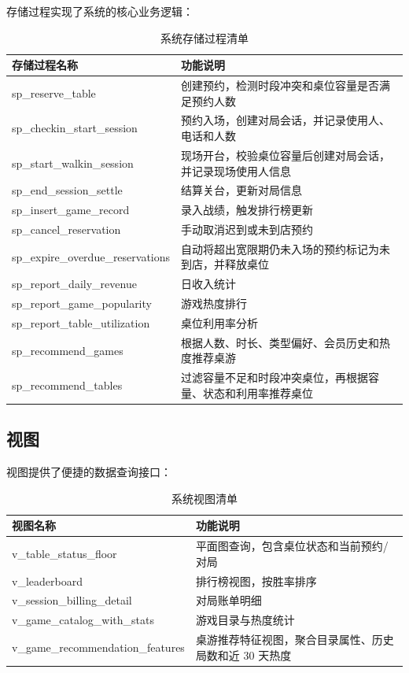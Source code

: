 存储过程实现了系统的核心业务逻辑：

\begin{table}[H]
  \centering
  \caption{系统存储过程清单}
  \label{tab:procedures}
  \begin{tabularx}{\textwidth}{|l|X|}
    \hline
    \textbf{存储过程名称} & \textbf{功能说明} \\
    \hline
    sp\_reserve\_table & 创建预约，检测时段冲突和桌位容量是否满足预约人数 \\
    \hline
    sp\_checkin\_start\_session & 预约入场，创建对局会话，并记录使用人、电话和人数 \\
    \hline
    sp\_start\_walkin\_session & 现场开台，校验桌位容量后创建对局会话，并记录现场使用人信息 \\
    \hline
    sp\_end\_session\_settle & 结算关台，更新对局信息 \\
    \hline
    sp\_insert\_game\_record & 录入战绩，触发排行榜更新 \\
    \hline
    sp\_cancel\_reservation & 手动取消迟到或未到店预约 \\
    \hline
    sp\_expire\_overdue\_reservations & 自动将超出宽限期仍未入场的预约标记为未到店，并释放桌位 \\
    \hline
    sp\_report\_daily\_revenue & 日收入统计 \\
    \hline
    sp\_report\_game\_popularity & 游戏热度排行 \\
    \hline
    sp\_report\_table\_utilization & 桌位利用率分析 \\
    \hline
    sp\_recommend\_games & 根据人数、时长、类型偏好、会员历史和热度推荐桌游 \\
    \hline
    sp\_recommend\_tables & 过滤容量不足和时段冲突桌位，再根据容量、状态和利用率推荐桌位 \\
    \hline
  \end{tabularx}
\end{table}

\subsection{视图}

视图提供了便捷的数据查询接口：

\begin{table}[H]
  \centering
  \caption{系统视图清单}
  \label{tab:views}
  \begin{tabularx}{\textwidth}{|l|X|}
    \hline
    \textbf{视图名称} & \textbf{功能说明} \\
    \hline
    v\_table\_status\_floor & 平面图查询，包含桌位状态和当前预约/对局 \\
    \hline
    v\_leaderboard & 排行榜视图，按胜率排序 \\
    \hline
    v\_session\_billing\_detail & 对局账单明细 \\
    \hline
    v\_game\_catalog\_with\_stats & 游戏目录与热度统计 \\
    \hline
    v\_game\_recommendation\_features & 桌游推荐特征视图，聚合目录属性、历史局数和近 30 天热度 \\
    \hline
  \end{tabularx}
\end{table}

